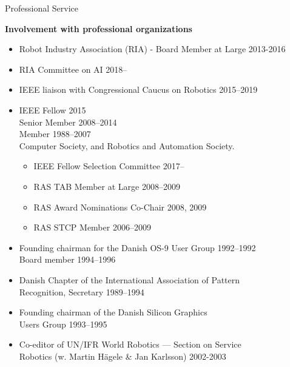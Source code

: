 \documentclass{article}
\begin{document}
\begin{cv}
\begin{cvlist}{Professional Service}
\item {\bf Involvement with professional organizations}
  \begin{itemize}
  \item Robot Industry Association (RIA) - Board Member at Large
    \cftdotfill{\cftdotsep} 2013-2016
  \item RIA Committee on AI \cftdotfill{\cftdotsep} 2018--
  \item IEEE liaison with Congressional Caucus on Robotics
    \cftdotfill{\cftdotsep}  2015--2019
  \item IEEE Fellow \cftdotfill{\cftdotsep} 2015\\
    Senior Member   \cftdotfill{\cftdotsep} 2008--2014\\
    Member \cftdotfill{\cftdotsep}    1988--2007\\
    Computer Society, and Robotics and Automation Society.
    \begin{itemize}
    \item IEEE Fellow Selection Committee \cftdotfill{\cftdotsep} 2017--
    \item RAS TAB Member at Large \cftdotfill{\cftdotsep} 2008--2009
    \item RAS Award Nominations Co-Chair \cftdotfill{\cftdotsep} 2008,
      2009
    \item RAS STCP Member \cftdotfill{\cftdotsep} 2006--2009
    \end{itemize}
  \item Founding chairman for the Danish OS-9 User Group
    \cftdotfill{\cftdotsep} 1992--1992\\ Board member
    \cftdotfill{\cftdotsep} 1994--1996
  \item Danish Chapter of the International Association of
    Pattern\\ Recognition, Secretary \cftdotfill{\cftdotsep}
    1989--1994
  \item Founding chairman of the Danish Silicon Graphics \\Users Group
    \cftdotfill{\cftdotsep} 1993--1995
  \item Co-editor of UN/IFR World Robotics --- Section on
    Service\\ Robotics (w. Martin H\"agele \& Jan Karlsson)
    \cftdotfill{\cftdotsep} 2002-2003
  \end{itemize}


\end{cvlist}
\end{cv}
\end{document}

